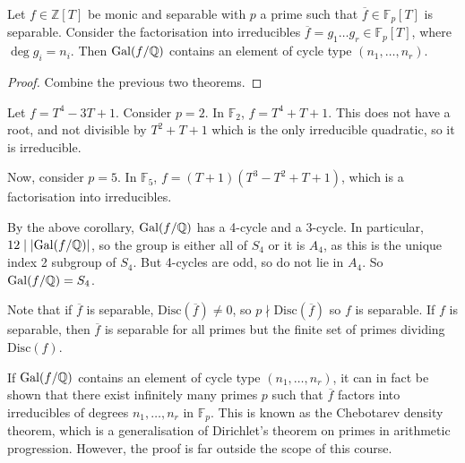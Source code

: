 \begin{corollary}
	Let \( f \in \mathbb Z[T] \) be monic and separable with \( p \) a prime such that \( \overline f \in \mathbb F_p[T] \) is separable.
	Consider the factorisation into irreducibles \( \overline f = g_1 \dots g_r \in \mathbb F_p[T] \), where \( \deg g_i = n_i \).
	Then \( \operatorname{Gal}(f/\mathbb Q) \) contains an element of cycle type \( (n_1, \dots, n_r) \).
\end{corollary}
\begin{proof}
	Combine the previous two theorems.
\end{proof}
\begin{example}
	Let \( f = T^4 - 3T + 1 \).
	Consider \( p = 2 \).
	In \( \mathbb F_2 \), \( f = T^4 + T + 1 \).
	This does not have a root, and not divisible by \( T^2 + T + 1 \) which is the only irreducible quadratic, so it is irreducible.

	Now, consider \( p = 5 \).
	In \( \mathbb F_5 \), \( f = (T+1)(T^3 - T^2 + T + 1) \), which is a factorisation into irreducibles.

	By the above corollary, \( \operatorname{Gal}(f/\mathbb Q) \) has a 4-cycle and a 3-cycle.
	In particular, \( 12 \mid \abs{\operatorname{Gal}(f/\mathbb Q)} \), so the group is either all of \( S_4 \) or it is \( A_4 \), as this is the unique index 2 subgroup of \( S_4 \).
	But 4-cycles are odd, so do not lie in \( A_4 \).
	So \( \operatorname{Gal}(f/\mathbb Q) = S_4 \).

	Note that if \( \overline f \) is separable, \( \mathrm{Disc}(\overline f) \neq 0 \), so \( p \nmid \mathrm{Disc}(\overline f) \) so \( f \) is separable.
	If \( f \) is separable, then \( \overline f \) is separable for all primes but the finite set of primes dividing \( \mathrm{Disc}(f) \).
\end{example}
\begin{remark}
	If \( \operatorname{Gal}(f/\mathbb Q) \) contains an element of cycle type \( (n_1, \dots, n_r) \), it can in fact be shown that there exist infinitely many primes \( p \) such that \( \overline f \) factors into irreducibles of degrees \( n_1, \dots, n_r \) in \( \mathbb F_p \).
	This is known as the Chebotarev density theorem, which is a generalisation of Dirichlet's theorem on primes in arithmetic progression.
	However, the proof is far outside the scope of this course.
\end{remark}
